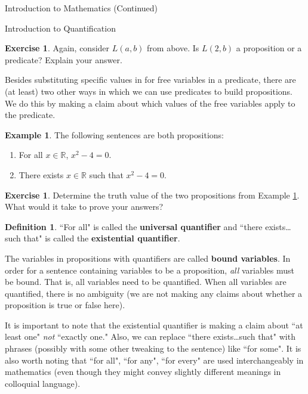 \documentclass[11pt]{article}
\theoremstyle{definition}
\newtheorem{definition}[theorem]{Definition}
\newtheorem{example}[theorem]{Example}
\newtheorem{exercise}[theorem]{Exercise}
\begin{document}
\begin{section}{Introduction to Mathematics (Continued)}
\begin{subsection}{Introduction to Quantification}
\begin{exercise}
Again, consider $L(a,b)$ from above.  Is $L(2,b)$ a proposition or a predicate?  Explain your answer.
\end{exercise}

Besides substituting specific values in for free variables in a predicate, there are (at least) two other ways in which we can use predicates to build propositions.  We do this by making a claim about which values of the free variables apply to the predicate.

\begin{example}\label{ex:quantified predicates}
The following sentences are both propositions:
\begin{enumerate}
\item For all $x\in\mathbb{R}$, $x^2-4=0$.
\item There exists $x\in\mathbb{R}$ such that $x^2-4=0$.
\end{enumerate}
\end{example}

\begin{exercise}
Determine the truth value of the two propositions from Example \ref{ex:quantified predicates}.  What would it take to prove your answers?
\end{exercise}

\begin{definition}
``For all" is called the \textbf{universal quantifier} and ``there exists\ldots such that" is called the \textbf{existential quantifier}.
\end{definition}

The variables in propositions with quantifiers are called \textbf{bound variables}.  In order for a sentence containing variables to be a proposition, \emph{all} variables must be bound.  That is, all variables need to be quantified.  When all variables are quantified, there is no ambiguity (we are not making any claims about whether a proposition is true or false here).

It is important to note that the existential quantifier is making a claim about ``at least one" \emph{not} ``exactly one."    Also, we can replace ``there exists\ldots such that" with phrases (possibly with some other tweaking to the sentence) like ``for some".  It is also worth noting that ``for all", ``for any", ``for every" are used interchangeably in mathematics (even though they might convey slightly different meanings in colloquial language).  


\end{subsection}
\end{section}
\end{document}
